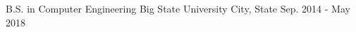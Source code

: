 \begin{cventries}
  \cventry
    {B.S. in Computer Engineering}
    {Big State University}
    {City, State}
    {Sep. 2014 - May 2018}
    {
      \begin{cvitems}
      \end{cvitems}
    }
\end{cventries}
